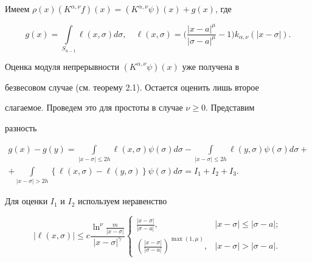 \begin{pf}


Имеем $\rho(x)(K^{\alpha,\nu}f)(x)=(K^{\alpha,\nu}\psi)(x) +g(x)$, где


$$


g(x) = \int \limits_{S_{n-1}}\ell(x,\sigma)d\sigma, \quad


\ell(x,\sigma)=\bigg(\frac{|x-a|^\mu}{|\sigma-a|^{\mu}} -1\bigg){


k}_{\alpha, \nu} (|x-\sigma|).


$$


Оценка модуля непрерывности $(K^{\alpha,\nu}\psi)(x)$ уже получена в


безвесовом случае (см. теорему 2.1). Остается оценить лишь второе


слагаемое. Проведем это для простоты в случае $\nu \ge 0$. Представим


разность


\begin{multline}


g(x) - g(y)= \int \limits_{|x-\sigma|\leq 2h} \ell(x,\sigma)


\psi(\sigma)


d\sigma - \int \limits_{|x-\sigma|\leq 2h} \ell(y,\sigma) \psi(\sigma)


d\sigma + \\


+ \int \limits_{|x-\sigma|>2h} \left\{ \ell(x,\sigma) - \ell(y,\sigma)


\right\} \psi(\sigma) d\sigma = I_1 + I_2 + I_3.


\end{multline}





Для оценки $I_1$ и $I_2$ используем неравенство


\begin{equation}


|\ell(x,\sigma)| \le c \frac{\ln^\nu \frac{m}{|x-\sigma|} }{|x-


\sigma|^\gamma}


\begin{cases}


\frac{|x-\sigma|}{|\sigma-a|}, & |x-\sigma| \le |\sigma-a|; \\


\left( \frac{|x-\sigma|}{|\sigma-a|}\right)^{\max(1,\mu)}, & |x-


\sigma| >|\sigma-a|.


\end{cases}



\end{equation}
\end{pf}
